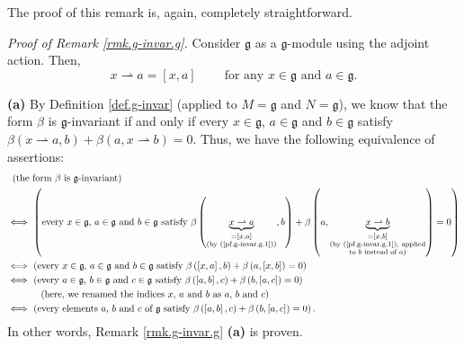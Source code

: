\documentclass[etingof-lie.tex]{subfiles}
\begin{document}
\begin{vershort}
The proof of this remark is, again, completely straightforward.
\end{vershort}

\begin{verlong}
\textit{Proof of Remark \ref{rmk.g-invar.g}.} Consider $\mathfrak{g}$ as a
$\mathfrak{g}$-module using the adjoint action. Then,%
\begin{equation}
x\rightharpoonup a=\left[  x,a\right]  \ \ \ \ \ \ \ \ \ \ \text{for any }%
x\in\mathfrak{g}\text{ and }a\in\mathfrak{g}. \label{pf.g-invar.g.1}%
\end{equation}


\textbf{(a)} By Definition \ref{def.g-invar} (applied to $M=\mathfrak{g}$ and
$N=\mathfrak{g}$), we know that the form $\beta$ is $\mathfrak{g}$-invariant
if and only if every $x\in\mathfrak{g}$, $a\in\mathfrak{g}$ and $b\in
\mathfrak{g}$ satisfy $\beta\left(  x\rightharpoonup a,b\right)  +\beta\left(
a,x\rightharpoonup b\right)  =0$. Thus, we have the following equivalence of
assertions:%
\begin{align}
&  \ \left(  \text{the form }\beta\text{ is }\mathfrak{g}\text{-invariant}%
\right) \nonumber\\
&  \Longleftrightarrow\ \left(  \text{every }x\in\mathfrak{g}\text{, }%
a\in\mathfrak{g}\text{ and }b\in\mathfrak{g}\text{ satisfy }\beta\left(
\underbrace{x\rightharpoonup a}_{\substack{=\left[  x,a\right]  \\\text{(by
(\ref{pf.g-invar.g.1}))}}},b\right)  +\beta\left(
a,\underbrace{x\rightharpoonup b}_{\substack{=\left[  x,b\right]  \\\text{(by
(\ref{pf.g-invar.g.1}), applied}\\\text{to }b\text{ instead of }a\text{)}%
}}\right)  =0\right) \nonumber\\
&  \Longleftrightarrow\ \left(  \text{every }x\in\mathfrak{g}\text{, }%
a\in\mathfrak{g}\text{ and }b\in\mathfrak{g}\text{ satisfy }\beta\left(
\left[  x,a\right]  ,b\right)  +\beta\left(  a,\left[  x,b\right]  \right)
=0\right) \label{pf.g-invar.g.a}\\
&  \Longleftrightarrow\ \left(  \text{every }a\in\mathfrak{g}\text{, }%
b\in\mathfrak{g}\text{ and }c\in\mathfrak{g}\text{ satisfy }\beta\left(
\left[  a,b\right]  ,c\right)  +\beta\left(  b,\left[  a,c\right]  \right)
=0\right) \nonumber\\
&  \ \ \ \ \ \ \ \ \ \ \left(  \text{here, we renamed the indices }x\text{,
}a\text{ and }b\text{ as }a\text{, }b\text{ and }c\right) \nonumber\\
&  \Longleftrightarrow\ \left(  \text{every elements }a\text{, }b\text{ and
}c\text{ of }\mathfrak{g}\text{ satisfy }\beta\left(  \left[  a,b\right]
,c\right)  +\beta\left(  b,\left[  a,c\right]  \right)  =0\right)  .\nonumber
\end{align}
In other words, Remark \ref{rmk.g-invar.g} \textbf{(a)} is proven.


\end{verlong}
\end{document}
